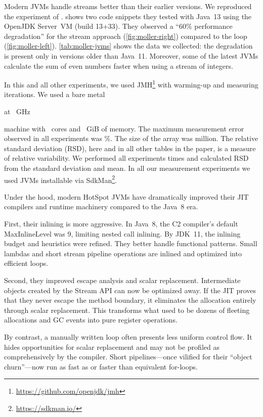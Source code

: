 \begin{table}
\setlength{\tabcolsep}{.3em}
\end{table}

Modern JVMs handle streams better than their earlier versions.
We reproduced the experiment of \citet{moller2020eliminating}.
 shows two code snippets they tested with Java~13 using the OpenJDK Server~VM (build 13+33).
They observed a ``60\% performance degradation'' for the stream approach (\cref{fig:moller-right}) compared to the loop (\cref{fig:moller-left}).
\cref{tab:moller-jvms} shows the data we collected: the degradation is present only in versions older than Java~11.
Moreover, some of the latest JVMs calculate the sum of even numbers faster when using a stream of integers.

In this and all other experiments, we used JMH\footnote{\url{https://github.com/openjdk/jmh}} with
   warming-up and  measuring iterations.
We used
  a bare metal
  
  at
  ~GHz
  
  machine
  with ~cores
  and ~GiB of memory.
The maximum measurement error observed in all experiments was \%.
The size of the  array was  million.
The relative standard deviation (RSD), here and in all other tables in the paper, is a measure of relative variability.
We performed all experiments  times and calculated RSD from the standard deviation and mean.
In all our measurement experiments we used JVMs installable via SdkMan\footnote{\url{https://sdkman.io/}}.

Under the hood, modern HotSpot JVMs have dramatically improved their JIT compilers and runtime machinery compared to the Java~8 era.

First, their inlining is more aggressive.
In Java~8, the C2 compiler's default MaxInlineLevel was 9, limiting nested call inlining.
By JDK~11, the inlining budget and heuristics were refined.
They better handle functional patterns.
Small lambdas and short stream pipeline operations are inlined and optimized into efficient loops.

Second, they improved escape analysis and scalar replacement.
Intermediate objects created by the Stream API can now be optimized away.
If the JIT proves that they never escape the method boundary, it eliminates the allocation entirely through scalar replacement.
This transforms what used to be dozens of fleeting allocations and GC events into pure register operations.

By contrast, a manually written loop often presents less uniform control flow.
It hides opportunities for scalar replacement and may not be profiled as comprehensively by the compiler.
Short pipelines---once vilified for their ``object churn''---now run as fast as or faster than equivalent for-loops.
